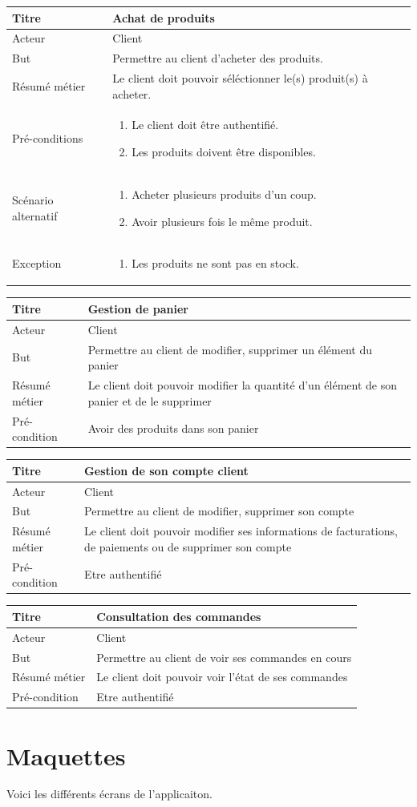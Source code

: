 \documentclass[12pt]{article}
\newcommand\addrow[2]{#1 &#2\\ }
\newcommand\addheading[2]{\textbf{#1} &#2\\ \hline}
\newcommand\tabularhead{\begin{tabular}{lp{11cm}}
\hline
}
\newcommand\addmulrow[2]{ \begin{minipage}[t][][t]{3.5cm}#1\end{minipage}%
    &\begin{minipage}[t][][t]{11cm}
    \begin{enumerate} #2   \end{enumerate}
    \end{minipage}\\ }
\newenvironment{usecase}{\tabularhead}
{\hline\end{tabular}}
\begin{document}
\begin{usecase}
    \addheading{Titre}{Achat de produits}
    \addrow{Acteur}{Client}
    \addrow{But}{Permettre au client d'acheter des produits.}
    \addrow{Résumé métier}{Le client doit pouvoir séléctionner le(s) produit(s) à acheter.}
    \addmulrow{Pré-conditions}{
    \item Le client doit être authentifié.
    \item Les produits doivent être disponibles.
    }
    \addmulrow{Scénario alternatif}{
    \item Acheter plusieurs produits d'un coup.
    \item Avoir plusieurs fois le même produit.
    }
    \addmulrow{Exception}{
    \item Les produits ne sont pas en stock.
    }
\end{usecase}

\begin{usecase}
    \addheading{Titre}{Gestion de panier}
    \addrow{Acteur}{Client}
    \addrow{But}{Permettre au client de modifier, supprimer un élément du panier}
    \addrow{Résumé métier}{Le client doit pouvoir modifier la quantité d'un élément de son panier et de le supprimer}
    \addrow{Pré-condition}{Avoir des produits dans son panier}
\end{usecase}

\begin{usecase}
    \addheading{Titre}{Gestion de son compte client}
    \addrow{Acteur}{Client}
    \addrow{But}{Permettre au client de modifier, supprimer son compte}
    \addrow{Résumé métier}{Le client doit pouvoir modifier ses informations de facturations, de paiements ou de supprimer son compte}
    \addrow{Pré-condition}{Etre authentifié}
\end{usecase}

\begin{usecase}
    \addheading{Titre}{Consultation des commandes}
    \addrow{Acteur}{Client}
    \addrow{But}{Permettre au client de voir ses commandes en cours}
    \addrow{Résumé métier}{Le client doit pouvoir voir l'état de ses commandes}
    \addrow{Pré-condition}{Etre authentifié}
\end{usecase}

\newpage
\section{Maquettes}

Voici les différents écrans de l'applicaiton.
\end{document}
